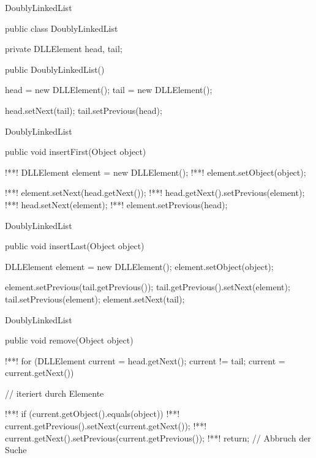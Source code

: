 \begin{frame}[fragile]{DoublyLinkedList}
    \begin{solve}
    \begin{plainjava}
public class DoublyLinkedList {
    private DLLElement head, tail;

    public DoublyLinkedList() {
        head = new DLLElement();
        tail = new DLLElement();

        head.setNext(tail);
        tail.setPrevious(head);
    }
}
    \end{plainjava}
    \end{solve}
\end{frame}
\resetframecounters
\begin{frame}[fragile]{DoublyLinkedList}\onslide<+->
    \begin{solve}
    \begin{plainjava}
public void insertFirst(Object object) {
!*\onslide<+->*!    DLLElement element = new DLLElement();
!*\onslide<+->*!    element.setObject(object);

!*\onslide<+->*!    element.setNext(head.getNext());
!*\onslide<+->*!    head.getNext().setPrevious(element);
!*\onslide<+->*!    head.setNext(element);
!*\onslide<+->*!    element.setPrevious(head);
}
    \end{plainjava}
    \end{solve}
\end{frame}
\resetframecounters
\begin{frame}[fragile]{DoublyLinkedList}
    \begin{solve}
    \begin{plainjava}
public void insertLast(Object object) {
    DLLElement element = new DLLElement();
    element.setObject(object);

    element.setPrevious(tail.getPrevious());
    tail.getPrevious().setNext(element);
    tail.setPrevious(element);
    element.setNext(tail);
}
    \end{plainjava}
    \end{solve}
\end{frame}
\resetframecounters
\begin{frame}[fragile]{DoublyLinkedList}\onslide<+->
    \begin{solve}
    \begin{plainjava}
public void remove(Object object) {
!*\onslide<+->*!    for (DLLElement current = head.getNext(); current != tail; current = current.getNext()) { // iteriert durch Elemente

!*\onslide<+->*!            if (current.getObject().equals(object)) {
!*\onslide<+->*!                current.getPrevious().setNext(current.getNext());
!*\onslide<+->*!                current.getNext().setPrevious(current.getPrevious());
!*\onslide<+->*!                return; // Abbruch der Suche
            }
    }
}
    \end{plainjava}
    \end{solve}
\end{frame}
